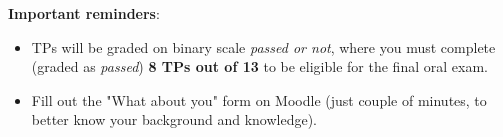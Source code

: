 \documentclass[handout]{beamer}
\begin{document}
\begin{frame}
\textbf{Important reminders}: \pause
\vspace{1cm}
\begin{itemize}
\item TPs will be graded on binary scale \textit{passed or not}, where you must complete (graded as \textit{passed}) \textbf{8 TPs out of 13} to be eligible for the final oral exam. \pause
\item Fill out the "What about you" form on Moodle (just couple of minutes, to better know your background and knowledge).
\end{itemize}
\end{frame}
\end{document}
